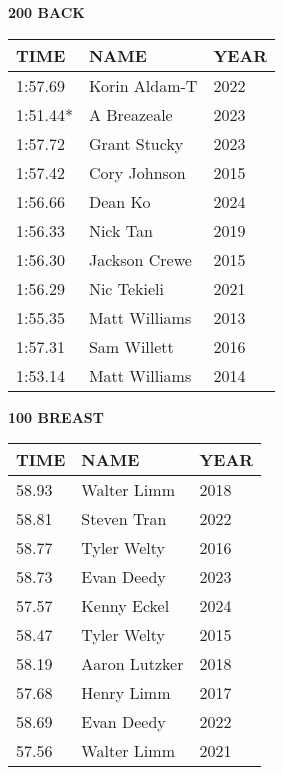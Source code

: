 \begin{minipage}[t]{0.48\textwidth}
\centering
\textbf{200 BACK}\\[0.05cm]
\begin{tabular}{@{}p{1.8cm}p{2.8cm}p{1.2cm}@{}}
\hline
\textbf{TIME} & \textbf{NAME} & \textbf{YEAR} \\
\hline
1:57.69 & Korin Aldam-T & 2022 \\
1:51.44* & A Breazeale & 2023 \\
1:57.72 & Grant Stucky & 2023 \\
1:57.42 & Cory Johnson & 2015 \\
1:56.66 & Dean Ko & 2024 \\
1:56.33 & Nick Tan & 2019 \\
1:56.30 & Jackson Crewe & 2015 \\
1:56.29 & Nic Tekieli & 2021 \\
1:55.35 & Matt Williams & 2013 \\
1:57.31 & Sam Willett & 2016 \\
1:53.14 & Matt Williams & 2014 \\
\hline
\end{tabular}
\end{minipage}\hfill
\begin{minipage}[t]{0.48\textwidth}
\centering
\textbf{100 BREAST}\\[0.05cm]
\begin{tabular}{@{}p{1.8cm}p{2.8cm}p{1.2cm}@{}}
\hline
\textbf{TIME} & \textbf{NAME} & \textbf{YEAR} \\
\hline
58.93 & Walter Limm & 2018 \\
58.81 & Steven Tran & 2022 \\
58.77 & Tyler Welty & 2016 \\
58.73 & Evan Deedy & 2023 \\
57.57 & Kenny Eckel & 2024 \\
58.47 & Tyler Welty & 2015 \\
58.19 & Aaron Lutzker & 2018 \\
57.68 & Henry Limm & 2017 \\
58.69 & Evan Deedy & 2022 \\
57.56 & Walter Limm & 2021 \\
\hline
\end{tabular}
\end{minipage}

\vspace{0.4cm}

